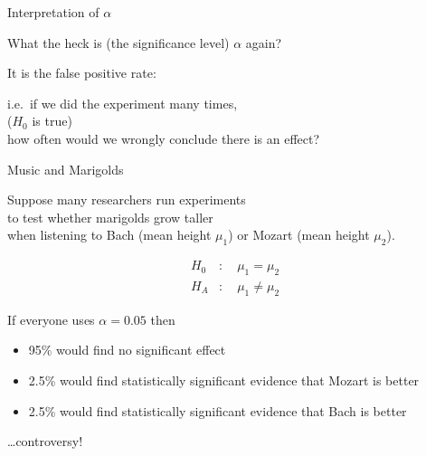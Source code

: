 \begin{frame}{Interpretation of $\alpha$}

  What the heck is (the significance level) $\alpha$ again?

  \vspace{2em}
  \pause

  It is the \alert{false positive rate}:

  \vspace{2em}
  \pause

  i.e.\ if we did the experiment many times,\\
   ($H_0$ is true)\\
  how often would we \alert{wrongly} conclude there is an effect?

\end{frame}



\begin{frame}{Music and Marigolds}

    Suppose many researchers run experiments\\
    to test whether marigolds grow taller \\
    when listening to Bach (mean height $\mu_1$) or Mozart (mean height $\mu_2$). 


    \vspace{2em}

    \begin{align*}
        H_0 &: \quad \mu_1 = \mu_2  \\
        H_A &: \quad \mu_1 \neq \mu_2 
    \end{align*}

    \vspace{2em}

    If everyone uses $\alpha=0.05$ then
    \begin{itemize}
        \item 95\% would find no significant effect
        \item 2.5\% would find statistically significant evidence that Mozart is better
        \item 2.5\% would find statistically significant evidence that Bach is better
    \end{itemize}
    \ldots \alert{controversy!}

\end{frame}



